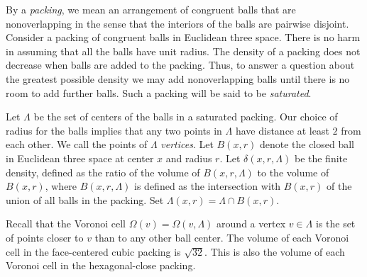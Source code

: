 


By a {\it packing}, we mean an arrangement of congruent balls that
are nonoverlapping in the sense that the interiors of the balls are
pairwise disjoint. Consider a \index{packing} packing of congruent
balls in Euclidean three space. There is no harm in assuming that
all the balls have unit radius. The density of a packing does not
decrease when balls are added to the packing. Thus, to answer a
question about the greatest possible density we may add
nonoverlapping balls until there is no room to add further balls.
Such a packing will be said to be {\it saturated}.
%

Let $\Lambda$ be the set of centers of the balls in a
\index{saturated} saturated packing. Our choice of radius for the
balls implies that any two points in $\Lambda$ have distance at
least $2$ from each other. We call the points of $\Lambda$ {\it
{} vertices}.  Let $B(x,r)$ denote the closed ball in
Euclidean three space at center $x$ and radius $r$. Let
$\delta(x,r,\Lambda)$ be the finite density, defined as the ratio
of the volume of $B(x,r,\Lambda)$ to the volume of $B(x,r)$, where
$B(x,r,\Lambda)$ is defined as the intersection with $B(x,r)$ of
the union of all balls in the packing. Set $\Lambda(x,r) = \Lambda
\cap B(x,r)$.\index{ZZdelta@$\delta(x,r,\Lambda)$}

Recall that the  Voronoi cell
$\Omega(v)=\Omega(v,\Lambda)$ around a
vertex $v\in \Lambda$ is the set of points closer to $v$ than to
any other ball center. The volume of each Voronoi cell in the
face-centered cubic packing is $\sqrt{32}$.  This is also the
volume of each Voronoi cell in the hexagonal-close packing.

